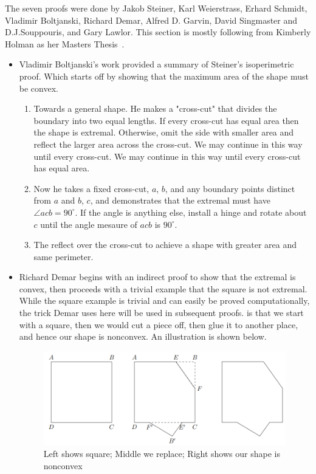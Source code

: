\documentclass[a4paper]{book}
\numberwithin{theorem}{section}%
\begin{document}
The seven proofs were done by Jakob Steiner, Karl Weierstrass, Erhard Schmidt, Vladimir Boltjanski, Richard Demar, Alfred D. Garvin, David Singmaster and D.J.Souppouris, and Gary Lawlor. This section is mostly following from Kimberly Holman as her Masters Thesis~\citep{holman2022isoperimetric}.
\begin{itemize}
    \item Vladimir Boltjanski's work provided a summary of Steiner's isoperimetric proof. Which starts off by showing that the maximum area of the shape must be convex. 
    \begin{enumerate}
        \item Towards a general shape. He makes a "cross-cut" that divides the boundary into two equal lengths. If every cross-cut has equal area then the shape is extremal. Otherwise, omit the side with smaller area and reflect the larger area across the cross-cut. We may continue in this way until every cross-cut. We may continue in this way until every cross-cut has equal area.
        \item Now  he takes a fixed cross-cut, $a$, $b$, and any boundary points distinct from $a$ and $b$, $c$, and demonstrates that the extremal must have $\angle acb=90^{\circ}$. If the angle is anything else, install a hinge and rotate about $c$ until the angle mesaure of $acb$ is $90^{\circ}$.
        \item The reflect over the cross-cut to achieve a shape with greater area and same perimeter.
    \end{enumerate}

    \item Richard Demar begins with an indirect proof to show that the extremal is convex, then proceeds with a trivial example that the square is not extremal. While the square example is trivial and can easily be proved computationally, the trick Demar uses here will be used in subsequent proofs. is that we start with a square, then we would cut a piece off, then glue it to another place, and hence our shape is nonconvex. An illustration is shown below.
    \begin{figure}[hbt!]
        \begin{center}   
            \includegraphics[width=120mm]{RichardDemar}
            \caption{Left shows square; Middle we replace; Right shows our shape is nonconvex}
        \end{center}
    \end{figure}


\end{itemize}
\end{document}
